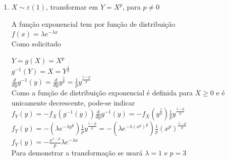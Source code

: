 \documentclass{article}
\begin{document}
\begin{enumerate}
\begin{enumerate}
    \end{enumerate}
  \item $X \sim \varepsilon(1)$, transformar em $Y = X^p$, para $p \neq 0$ 
  
  A função exponencial tem por função de distribuição\\
  
  $f(x) = \lambda e^{-\lambda x}$\\
  
  Como solicitado
  
  $Y = g(X) = X^p$\\
  
  $g^{-1}(Y) = X = Y^\frac{1}{p}$\\
  
  $\frac{d}{dy}g^{-1}(y) = \frac{d}{dy}y^\frac{1}{p} = \frac{1}{p}y^\frac{1-p}{p}$\\
  
  Como a função de distribuição exponencial é definida para $X \geq 0$ e é unicamente decrescente, pode-se indicar\\
  
  $f_Y(y) = -f_X(g^{-1}(y))\frac{d}{dy}g^{-1}(y) = -f_X(y^\frac{1}{p})\frac{1}{p}y^\frac{1-p}{p}$\\
  
  $f_Y(y) = -(\lambda e^{-\lambda y^\frac{1}{p}})\frac{1}{p}y^\frac{1-p}{p} = -(\lambda e^{-\lambda (x^p)^\frac{1}{p}})\frac{1}{p}(x^p)^\frac{1-p}{p}$\\
  
  $f_Y(y) = -\frac{x^{1-p}}{p}\lambda e^{-\lambda x}$\\
  
  Para demonstrar a transformação se usará $\lambda=1$ e $p=3$\\


\end{enumerate}
\end{document}
